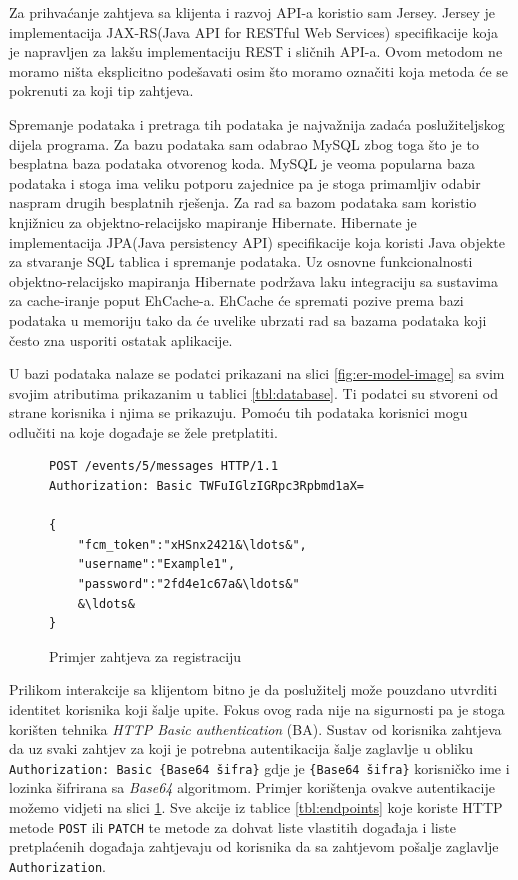 \documentclass[times, utf8, zavrsni]{fer}
\begin{document}
{Za prihvaćanje zahtjeva sa klijenta i razvoj API-a koristio sam Jersey. Jersey je implementacija JAX-RS(Java API for RESTful Web Services) specifikacije koja je napravljen za lakšu implementaciju REST i sličnih API-a. Ovom metodom ne moramo ništa eksplicitno podešavati osim što moramo označiti koja metoda će se pokrenuti za koji tip zahtjeva.

Spremanje podataka i pretraga tih podataka je najvažnija zadaća poslužiteljskog dijela programa. Za bazu podataka sam odabrao MySQL zbog toga što je to besplatna baza podataka otvorenog koda. MySQL je veoma popularna baza podataka i stoga ima veliku potporu zajednice pa je stoga primamljiv odabir naspram drugih besplatnih rješenja. Za rad sa bazom podataka sam koristio knjižnicu za objektno-relacijsko mapiranje Hibernate. Hibernate je implementacija JPA(Java persistency API) specifikacije koja koristi Java objekte za stvaranje SQL tablica i spremanje podataka. Uz osnovne funkcionalnosti objektno-relacijsko mapiranja Hibernate podržava laku integraciju sa sustavima za cache-iranje poput EhCache-a. EhCache će spremati pozive prema bazi podataka u memoriju tako da će uvelike ubrzati rad sa bazama podataka koji često zna usporiti ostatak aplikacije.

U bazi podataka nalaze se podatci prikazani na slici \ref{fig:er-model-image} sa svim svojim atributima prikazanim u tablici \ref{tbl:database}. Ti podatci su stvoreni od strane korisnika i njima se prikazuju. Pomoću tih podataka korisnici mogu odlučiti na koje događaje se žele pretplatiti.

\begin{figure}[htb]
\begin{lstlisting}
POST /events/5/messages HTTP/1.1
Authorization: Basic TWFuIGlzIGRpc3Rpbmd1aX=

{
	"fcm_token":"xHSnx2421&\ldots&",
	"username":"Example1",
	"password":"2fd4e1c67a&\ldots&"
	&\ldots&
}
\end{lstlisting}
\caption{Primjer zahtjeva za registraciju}
\label{lst:register-request}
\end{figure}

Prilikom interakcije sa klijentom bitno je da poslužitelj može pouzdano utvrditi identitet korisnika koji šalje upite. Fokus ovog rada nije na sigurnosti pa je stoga korišten tehnika {\em HTTP Basic authentication} (BA). Sustav od korisnika zahtjeva da uz svaki zahtjev za koji je potrebna autentikacija šalje zaglavlje u obliku {\tt Authorization: Basic \{Base64 šifra\}} gdje je {\tt \{Base64 šifra\}} korisničko ime i lozinka šifrirana sa {\em Base64} algoritmom. Primjer korištenja ovakve autentikacije možemo vidjeti na slici \ref{lst:register-request}. Sve akcije iz tablice \ref{tbl:endpoints} koje koriste HTTP metode {\tt POST} ili {\tt PATCH} te metode za dohvat liste vlastitih događaja i liste pretplaćenih događaja zahtjevaju od korisnika da sa zahtjevom pošalje zaglavlje {\tt Authorization}.

}
\end{document}

